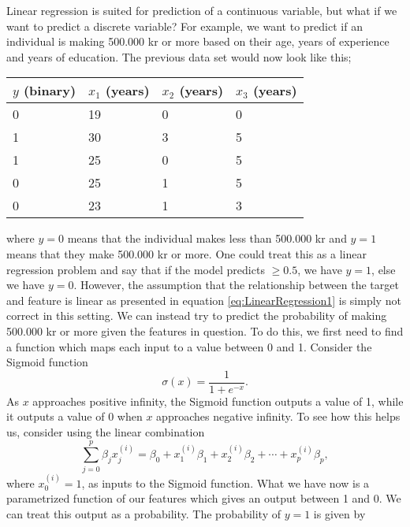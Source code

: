 Linear regression is suited for prediction of a continuous variable, but what if we want to predict a discrete variable? For example, we want to predict if an individual is making 500.000 kr or more based on their age, years of experience and years of education. The previous data set would now look like this;
\begin{table}[H]
\centering
\begin{tabular}{|l|l|l|l|}
\hline
$y$ (binary) & $x_1$ (years) & $x_2$ (years) & $x_3$ (years) \\ \hline
0            & 19            & 0             & 0             \\ \hline
1            & 30            & 3             & 5             \\ \hline
1            & 25            & 0             & 5             \\ \hline
0            & 25            & 1             & 5             \\ \hline
0            & 23            & 1             & 3    \\ \hline       
\end{tabular}
\end{table}
where $y=0$ means that the individual makes less than 500.000 kr and $y=1$ means that they make 500.000 kr or more. One could treat this as a linear regression problem and say that if the model predicts $\geq 0.5$, we have $y=1$, else we have $y=0$. However, the assumption that the relationship between the target and feature is linear as presented in equation \ref{eq:LinearRegression1} is simply not correct in this setting. We can instead try to predict the probability of making 500.000 kr or more given the features in question. To do this, we first need to find a function which maps each input to a value between 0 and 1. Consider the Sigmoid function
\begin{equation}
    \label{eq:Sigmoid}
    \sigma (x) = \frac{1}{1 + e^{-x}}.
\end{equation}
As $x$ approaches positive infinity, the Sigmoid function outputs a value of 1, while it outputs a value of 0 when $x$ approaches negative infinity. To see how this helps us, consider using the linear combination 
$$ \sum_{j=0}^p \beta_jx_j^{(i)} = \beta_0 + x_1^{(i)}\beta_1 + x_2^{(i)}\beta_2 + \cdots + x_p^{(i)}\beta_p, $$
where $x_0^{(i)} = 1$, as inputs to the Sigmoid function. What we have now is a parametrized function of our features which gives an output between 1 and 0. We can treat this output as a probability. The probability of $y=1$ is given by
